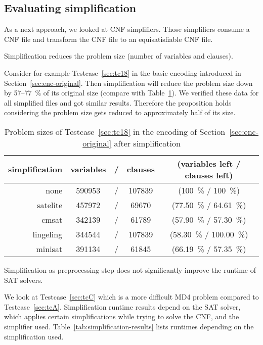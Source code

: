 \subsection{Evaluating simplification}
\label{sec:results-simplification}
%
As a next approach, we looked at CNF simplifiers. Those simplifiers consume a
CNF file and transform the CNF file to an equisatisfiable CNF file.

\begin{prop}
  Simplification reduces the problem size (number of variables and clauses).
\end{prop}

Consider for example Testcase~\ref{sec:tc18} in the basic encoding introduced
in Section~\ref{sec:enc-original}. Then simplification will reduce the problem
size down by 57--77~\% of its original size (compare with Table~\ref{tab:simpl-size}).
We verified these data for all simplified files and got similar results.
Therefore the proposition holds considering the problem size gets reduced to
approximately half of its size.

\begin{table}[!h]
  \begin{center}
    \begin{tabular}{rcccc}
      \textbf{simplification} & \textbf{variables} &/& \textbf{clauses} & \textbf{(variables left / clauses left)} \\
    \hline
                none &    590953 &/& 107839  & (100~\% / 100~\%) \\
            satelite &    457972 &/& 69670   & (77.50~\% / 64.61~\%) \\
               cmsat &    342139 &/& 61789   & (57.90~\% / 57.30~\%) \\
           lingeling &    344544 &/& 107839  & (58.30~\% / 100.00~\%) \\
             minisat &    391134 &/& 61845   & (66.19~\% / 57.35~\%)
    \end{tabular}
    \caption{
        Problem sizes of Testcase~\ref{sec:tc18} in the encoding of
        Section~\ref{sec:enc-original} after simplification
    }
    \label{tab:simpl-size}
  \end{center}
\end{table}

\begin{prop}
  Simplification as preprocessing step does not significantly improve the runtime of SAT solvers.
\end{prop}
%
We look at Testcase~\ref{sec:tcC} which is a more difficult MD4 problem
compared to Testcase~\ref{sec:tcA}. Simplification runtime results depend on the
SAT solver, which applies certain simplifications while trying to solve the
CNF, and the simplifier used. Table~\ref{tab:simplification-results}
lists runtimes depending on the simplification used.

